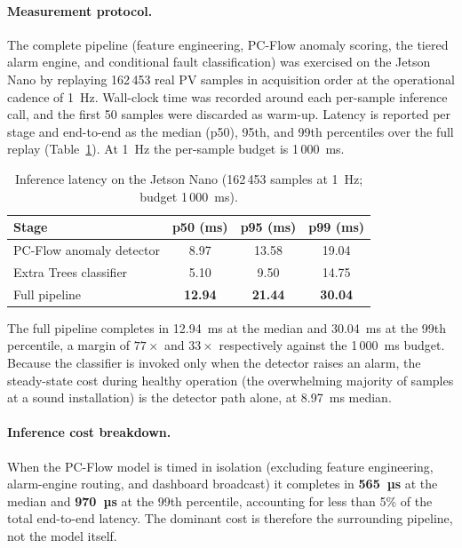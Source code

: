 \paragraph{Measurement protocol.} The complete pipeline (feature engineering, PC-Flow anomaly scoring, the tiered alarm engine, and conditional fault classification) was exercised on the Jetson Nano by replaying 162\,453 real PV samples in acquisition order at the operational cadence of 1~Hz. Wall-clock time was recorded around each per-sample inference call, and the first 50 samples were discarded as warm-up. Latency is reported per stage and end-to-end as the median (p50), 95th, and 99th percentiles over the full replay (Table~\ref{tab:deployment-latency}). At 1~Hz the per-sample budget is 1\,000~ms.

\begin{table}[H]
\centering
\caption{Inference latency on the Jetson Nano (162\,453 samples at 1~Hz; budget 1\,000~ms).}
\label{tab:deployment-latency}
\begin{tabular}{lccc}
\toprule
\textbf{Stage} & \textbf{p50 (ms)} & \textbf{p95 (ms)} & \textbf{p99 (ms)} \\
\midrule
PC-Flow anomaly detector  & 8.97  & 13.58 & 19.04 \\
Extra Trees classifier    & 5.10  & 9.50  & 14.75 \\
\midrule
Full pipeline             & \textbf{12.94} & \textbf{21.44} & \textbf{30.04} \\
\bottomrule
\end{tabular}
\end{table}

The full pipeline completes in 12.94~ms at the median and 30.04~ms at the 99th percentile, a margin of $77\times$ and $33\times$ respectively against the 1\,000~ms budget. Because the classifier is invoked only when the detector raises an alarm, the steady-state cost during healthy operation (the overwhelming majority of samples at a sound installation) is the detector path alone, at 8.97~ms median.

\paragraph{Inference cost breakdown.} When the PC-Flow model is timed in isolation (excluding feature engineering, alarm-engine routing, and dashboard broadcast) it completes in \textbf{565~µs} at the median and \textbf{970~µs} at the 99th percentile, accounting for less than 5\% of the total end-to-end latency. The dominant cost is therefore the surrounding pipeline, not the model itself.

